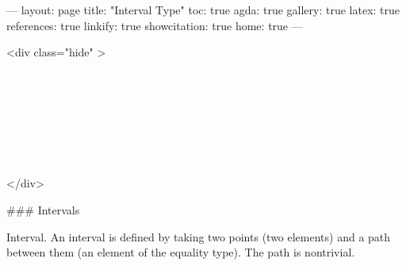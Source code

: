 ---
layout: page
title: "Interval Type"
toc: true
agda: true
gallery: true
latex: true
references: true
linkify: true
showcitation: true
home: true
---

<div class="hide" >
\begin{code}%
\>[0]\AgdaSymbol{\{-\#}\AgdaSpace{}%
\AgdaSpace{}%
\AgdaSpace{}%
\AgdaSymbol{\#-\}}\<%
\\
\>[0]\AgdaSpace{}%
\AgdaSpace{}%
\<%
\\
\>[0]\AgdaSpace{}%
\AgdaSpace{}%
\<%
\\
%
\\[\AgdaEmptyExtraSkip]%
\>[0]\AgdaSpace{}%
\AgdaSpace{}%
\<%
\\
\>[0]\AgdaSpace{}%
\AgdaSpace{}%
\<%
\\
\>[0]\AgdaSpace{}%
\AgdaSpace{}%
\<%
\end{code}
</div>

### Intervals

Interval. An interval is defined by taking two points (two elements) and a path
between them (an element of the equality type). The path is nontrivial.

